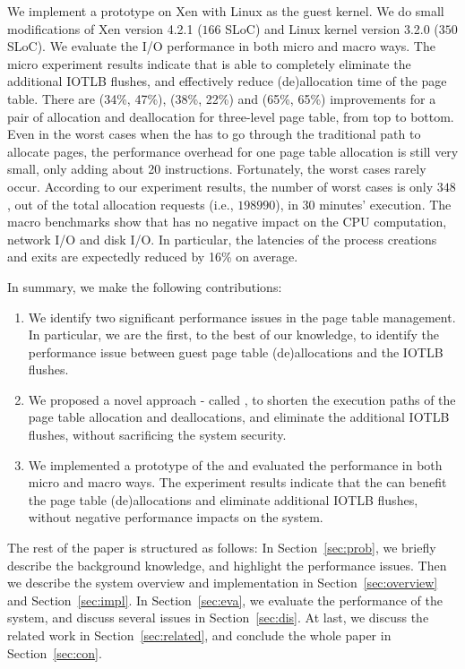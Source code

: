 We implement a prototype on Xen with Linux as the guest kernel. We do small modifications of Xen version 4.2.1 ($166$ SLoC) and Linux kernel version 3.2.0 ($350$ SLoC).
We evaluate the I/O performance in both micro and macro ways.
The micro experiment results indicate that \name is able to completely eliminate the additional IOTLB flushes, and effectively reduce (de)allocation time of the page table.
There are (34\%, 47\%), (38\%, 22\%) and (65\%, 65\%) improvements for a pair of allocation and deallocation for three-level page table, from top to bottom.
Even in the worst cases when the \name has to go through the traditional path to allocate pages, the performance overhead for one page table allocation is still very small, only adding about 20 instructions. Fortunately, the worst cases rarely occur. According to our experiment results, the number of worst cases is only $348$, out of the total allocation requests (i.e., $198990$), in 30 minutes' execution.
The macro benchmarks show that \name has no negative impact on the CPU computation, network I/O and disk I/O.
In particular, the latencies of the process creations and exits are expectedly reduced by 16\% on average.

In summary, we make the following contributions:
\begin{enumerate}
\item We identify two significant performance issues in the page table management. In particular, we are the first, to the best of our knowledge, to identify the performance issue between guest page table (de)allocations and the IOTLB flushes.
\item We proposed a novel approach - called \name, to shorten the execution paths of the page table allocation and deallocations, and eliminate the additional IOTLB flushes, without sacrificing the system security.
\item We implemented a prototype of the \name and evaluated the performance in both micro and macro ways. The experiment results indicate that the \name can benefit the page table (de)allocations and eliminate additional IOTLB flushes, without negative performance impacts on the system.
\end{enumerate}

The rest of the paper is structured as follows: In Section~\ref{sec:prob}, we briefly describe the background knowledge, and highlight the performance issues. Then we describe the system overview and implementation in Section~\ref{sec:overview} and Section~\ref{sec:impl}. In Section~\ref{sec:eva}, we evaluate the performance of the \name system, and discuss several issues in Section~\ref{sec:dis}. At last, we discuss the related work in Section~\ref{sec:related}, and conclude the whole paper in Section~\ref{sec:con}.

